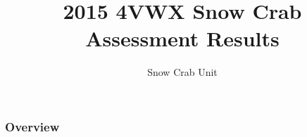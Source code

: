 \usepackage{graphicx} %
\usepackage{graphics}
\usepackage{booktabs} %

\newcommand{\e}{/home/michelle/bio.data/}
\newcommand{\es}{snowcrab/}
\newcommand{\Ay}{assessments/2015/}
\newcommand{\A}{assessments/}


\title{2015 4VWX Snow Crab Assessment Results} %

\author{Snow Crab Unit} %
\date{\the\year} %



\begin{frame}
\titlepage %
\end{frame}

\begin{frame}
\frametitle{Overview} %
\tableofcontents %
\end{frame}




